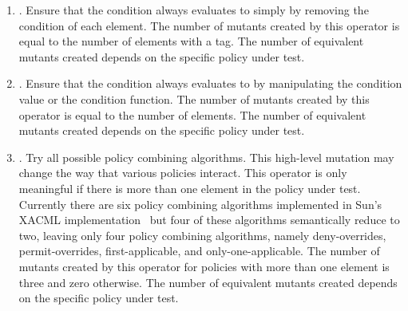 {\begin{enumerate}
\item {}. Ensure that the condition
always evaluates to  simply by removing the condition
of each  element. The number of mutants created by this
operator is equal to the number of  elements with a
 tag. The number of equivalent mutants created
depends on the specific policy under test.

\item {}. Ensure that the
condition always evaluates to  by manipulating the
condition value or the condition function. The number of mutants
created by this operator is equal to the number of 
elements. The number of equivalent mutants created depends on the
specific policy under test.



\item {}. Try all
possible policy combining algorithms. This high-level mutation may
change the way that various policies interact. This operator is only
meaningful if there is more than one  element in the
policy under test. Currently there are six policy combining
algorithms implemented in Sun's XACML
implementation~\cite{sun05:xacml} but four of these algorithms
semantically reduce to two, leaving only four policy combining
algorithms, namely deny-overrides, permit-overrides,
first-applicable, and only-one-applicable. The number of mutants
created by this operator for policies with more than one
 element is three and zero otherwise. The number of
equivalent mutants created depends on the specific policy under
test.


\end{enumerate}}
